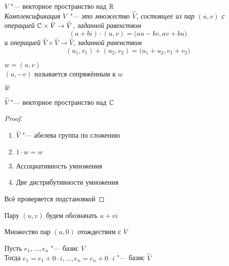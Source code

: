 \begin{definition}
	$ V $ "--- векторное пространство над $ \mathbb{R} $ \\
	\it{Комплексификация} $ V $ "--- это множество $ \hat{V} $, состоящее из пар $ (u, v) $ с операцией $ \mathbb{C} \times \hat{V} \to \hat{V} $, заданной равенством
	$$ (a + bi) \cdot (u, v) = \big( au - bv, av + bu \big) $$
	и операцией $ \hat{V} \times \hat{V} \to \hat V $, заданной равенством
	$$ (u_1, v_1) + (u_2, v_2) = \big( u_1 + u_2, v_1 + v_2 \big) $$
\end{definition}

\begin{definition}
	$ w = (u, v) $ \\
	$ (u, -v) $ называется сопряжённым к $ w $
\end{definition}

\begin{notation}
	$ \overline{w} $
\end{notation}

\begin{theorem}
	$ \hat{V} $ "--- векторное пространство над $ \mathbb{C} $
\end{theorem}

\begin{proof}
	\hfill
	\begin{enumerate}
		\item $ \hat{V} $ "--- абелева группа по сложению
		\item $ 1 \cdot w = w $
		\item Ассоциативность умножения
		\item Две дистрибутивности умножения
	\end{enumerate}
	Всё проверяется подстановкой
\end{proof}

\begin{notation}
	Пару $ (u, v) $ будем обозначать $ u + vi $
\end{notation}

\begin{notation}
	Множество пар $ (u, 0) $ отождествим с $ V $
\end{notation}

\begin{theorem}
	Пусть $ e_1, \dots, e_n $ "--- базис $ V $ \\
	Тогда $ e_1 = e_1 + 0 \cdot i, \dots, e_n = e_n + 0 \cdot i $ "--- базис $ \hat{V} $
\end{theorem}

